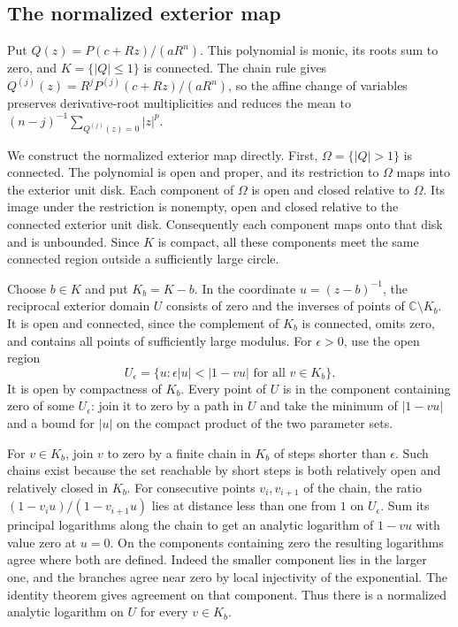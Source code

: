 \documentclass[11pt]{article}
\newcommand{\C}{\mathbb C}
\begin{document}
	\subsection{The normalized exterior map}
	Put $Q(z)=P(c+Rz)/(aR^n)$. This polynomial is monic, its roots sum to
	zero, and $K=\{|Q|\le1\}$ is connected. The chain rule gives
	$Q^{(j)}(z)=R^j P^{(j)}(c+Rz)/(aR^n)$, so the affine change of
	variables preserves derivative-root multiplicities and reduces the
	mean to $(n-j)^{-1}\sum_{Q^{(j)}(z)=0}|z|^p$.
	
	We construct the normalized exterior map directly. First,
	$\Omega=\{|Q|>1\}$ is connected. The polynomial is open and proper,
	and its restriction to $\Omega$ maps into the exterior unit disk.
	Each component of $\Omega$ is open and closed relative to $\Omega$.
	Its image under the restriction is nonempty, open and closed
	relative to the connected exterior unit disk. Consequently each
	component maps onto that disk and is unbounded. Since $K$ is compact,
	all these components meet the same connected region outside a
	sufficiently large circle.
	
	Choose $b\in K$ and put $K_b=K-b$. In the coordinate $u=(z-b)^{-1}$,
	the reciprocal exterior domain $U$ consists of zero and the inverses
	of points of $\C\setminus K_b$. It is open and connected, since the
	complement of $K_b$ is connected, omits zero, and contains all points
	of sufficiently large modulus. For $\epsilon>0$, use the open region
	\[
	U_\epsilon=\{u: \epsilon |u|<|1-vu|\text{ for all }v\in K_b\}.
	\]
	It is open by compactness of $K_b$. Every point of $U$ is in the
	component containing zero of some $U_\epsilon$: join it to zero
	by a path in $U$ and take the minimum of $|1-vu|$ and a bound for
	$|u|$ on the compact product of the two parameter sets.
	
	For $v\in K_b$, join $v$ to zero by a finite chain in $K_b$ of steps
	shorter than $\epsilon$. Such chains exist because the set reachable
	by short steps is both relatively open and relatively closed in
	$K_b$. For consecutive points $v_i,v_{i+1}$ of the chain, the ratio
	$(1-v_i u)/(1-v_{i+1}u)$ lies at distance less than one from $1$ on
	$U_\epsilon$. Sum its principal logarithms along the chain to get
	an analytic logarithm of $1-vu$ with value zero at $u=0$.
	On the components containing zero the resulting logarithms agree
	where both are defined. Indeed the smaller component lies in the
	larger one, and the branches agree near zero by local injectivity of
	the exponential. The identity theorem gives agreement on that
	component. Thus there is a normalized analytic logarithm on $U$ for
	every $v\in K_b$.
	
\end{document}
